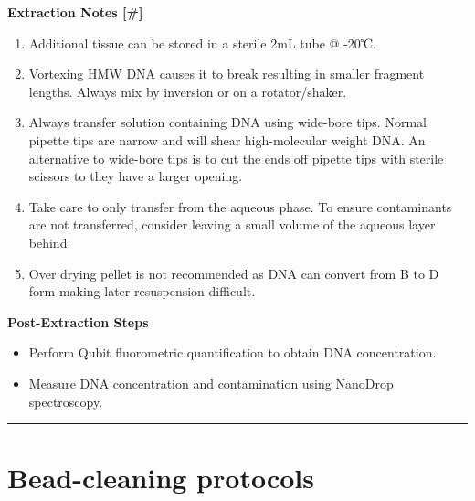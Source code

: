 \documentclass[
]{book}
\providecommand{\tightlist}{%
  \setlength{\itemsep}{0pt}\setlength{\parskip}{0pt}}
\begin{document}
\textbf{Extraction Notes {[}\#{]}}~

\begin{enumerate}
\def\labelenumi{\arabic{enumi}.}
\tightlist
\item
  Additional tissue can be stored in a sterile 2mL tube @ -20℃.
\item
  Vortexing HMW DNA causes it to break resulting in smaller fragment lengths. Always mix by inversion or on a rotator/shaker.
\item
  Always transfer solution containing DNA using wide-bore tips. Normal pipette tips are narrow and will shear high-molecular weight DNA. An alternative to wide-bore tips is to cut the ends off pipette tips with sterile scissors to they have a larger opening.
\item
  Take care to only transfer from the aqueous phase. To ensure contaminants are not transferred, consider leaving a small volume of the aqueous layer behind.
\item
  Over drying pellet is not recommended as DNA can convert from B to D form making later resuspension difficult.
\end{enumerate}

\textbf{Post-Extraction Steps}~

\begin{itemize}
\item
  Perform Qubit fluorometric quantification to obtain DNA concentration.~
\item
  Measure DNA concentration and contamination using NanoDrop spectroscopy.~
\end{itemize}

\begin{center}\rule{0.5\linewidth}{0.5pt}\end{center}

\hypertarget{bead-cleaning-protocols}{%
\section{Bead-cleaning protocols}\label{bead-cleaning-protocols}}
\end{document}
